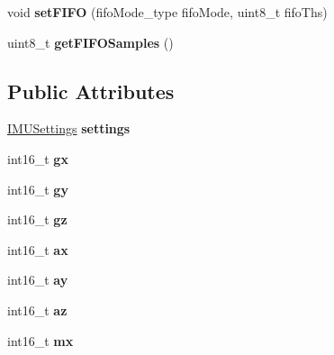 \begin{DoxyCompactItemize}
\item 
void {\bfseries set\+F\+I\+FO} (fifo\+Mode\+\_\+type fifo\+Mode, uint8\+\_\+t fifo\+Ths)\hypertarget{classLSM9DS1_a0ec4a93a34545af1acc336bae9b360f1}{}\label{classLSM9DS1_a0ec4a93a34545af1acc336bae9b360f1}

\item 
uint8\+\_\+t {\bfseries get\+F\+I\+F\+O\+Samples} ()\hypertarget{classLSM9DS1_ac03ef2ff928a25c4a80af7707cd92dc8}{}\label{classLSM9DS1_ac03ef2ff928a25c4a80af7707cd92dc8}

\end{DoxyCompactItemize}
\subsection*{Public Attributes}
\begin{DoxyCompactItemize}
\item 
\hyperlink{structIMUSettings}{I\+M\+U\+Settings} {\bfseries settings}\hypertarget{classLSM9DS1_a8397fc6c94a11a8a09f3dd17b28cf2a4}{}\label{classLSM9DS1_a8397fc6c94a11a8a09f3dd17b28cf2a4}

\item 
int16\+\_\+t {\bfseries gx}\hypertarget{classLSM9DS1_abf02b4544b5d529036adbac02e7b9f02}{}\label{classLSM9DS1_abf02b4544b5d529036adbac02e7b9f02}

\item 
int16\+\_\+t {\bfseries gy}\hypertarget{classLSM9DS1_a0c351823fd094ff24ff245dd951cf783}{}\label{classLSM9DS1_a0c351823fd094ff24ff245dd951cf783}

\item 
int16\+\_\+t {\bfseries gz}\hypertarget{classLSM9DS1_ad4d0f0585398ff917afcba1b4a73e519}{}\label{classLSM9DS1_ad4d0f0585398ff917afcba1b4a73e519}

\item 
int16\+\_\+t {\bfseries ax}\hypertarget{classLSM9DS1_adac13514d176cfb54aed8cda9a056335}{}\label{classLSM9DS1_adac13514d176cfb54aed8cda9a056335}

\item 
int16\+\_\+t {\bfseries ay}\hypertarget{classLSM9DS1_a978a357dedfa574d6e0fad33ad71e23f}{}\label{classLSM9DS1_a978a357dedfa574d6e0fad33ad71e23f}

\item 
int16\+\_\+t {\bfseries az}\hypertarget{classLSM9DS1_aa631c8a90b90130b5be147dd4fae0841}{}\label{classLSM9DS1_aa631c8a90b90130b5be147dd4fae0841}

\item 
int16\+\_\+t {\bfseries mx}\hypertarget{classLSM9DS1_a0e68eb9e44969070b6d84a93ba252f71}{}\label{classLSM9DS1_a0e68eb9e44969070b6d84a93ba252f71}


\end{DoxyCompactItemize}
